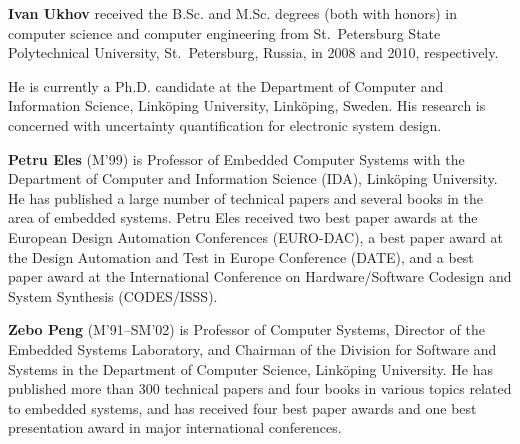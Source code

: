 \newenvironment{biography}{\vspace{1em}\footnotesize}{\relax\par\normalfont}

\begin{biography}
\noindent\textbf{Ivan Ukhov} received the B.Sc. and M.Sc. degrees (both with honors) in computer science and computer engineering from St.~Petersburg State Polytechnical University, St.~Petersburg, Russia, in 2008 and 2010, respectively.

He is currently a Ph.D. candidate at the Department of Computer and Information Science, Link\"{o}ping University, Link\"{o}ping, Sweden.
His research is concerned with uncertainty quantification for electronic system design.
\end{biography}

\begin{biography}
\noindent\textbf{Petru Eles} (M'99) is Professor of Embedded Computer Systems with the Department of Computer and Information Science (IDA), Link\"{o}ping University.
He has published a large number of technical papers and several books in the area of embedded systems.
Petru Eles received two best paper awards at the European Design Automation Conferences (EURO-DAC), a best paper award at the Design Automation and Test in Europe Conference (DATE), and a best paper award at the International Conference on Hardware/Software Codesign and System Synthesis (CODES/ISSS).
\end{biography}

\begin{biography}
\noindent\textbf{Zebo Peng} (M'91--SM'02) is Professor of Computer Systems, Director of the Embedded Systems Laboratory, and Chairman of the Division for Software and Systems in the Department of Computer Science, Link\"{o}ping University.
He has published more than 300 technical papers and four books in various topics related to embedded systems, and has received four best paper awards and one best presentation award in major international conferences.
\end{biography}
